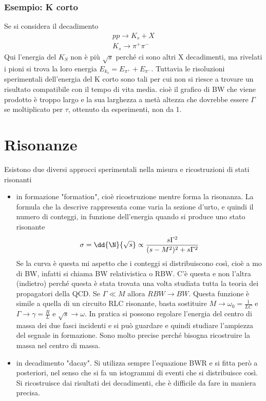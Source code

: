 \documentclass[12pt]{book}
\begin{document}
	\subsubsection{Esempio: K corto}
	Se si considera il decadimento 
	\begin{gather}
		p p \rightarrow K_s + X\\
		K_s \rightarrow \pi^+ \pi^-
	\end{gather}
	Qui l'energia del $K_S$ non è più $\sqrt{s}$ perché ci sono altri X decadimenti, ma rivelati i pioni si trova la loro energia $E_{k_s} = E_{\pi^+}+ E_{\pi^-}$. Tuttavia le risoluzioni sperimentali dell'energia del K corto sono tali per cui non si riesce a trovare un risultato compatibile con il tempo di vita media. cioè il grafico di BW che viene prodotto è troppo largo e la sua larghezza a metà altezza che dovrebbe essere $\Gamma$ se moltiplicato per $\tau$, ottenuto da esperimenti, non da 1.


\section{Risonanze}
Esistono due diversi approcci sperimentali nella misura e ricostruzioni di stati risonanti
\begin{itemize}
	\item in formazione "formation", cioè ricostruzione mentre forma la risonanza. La formula che la descrive rappresenta come varia la sezione d'urto, e quindi il numero di conteggi, in funzione dell'energia quando si produce uno stato risonante
	\begin{equation}
		\sigma = \dd{\N}{\sqrt{s}} \propto \frac{s \Gamma^2}{(s-M^2)^2 + s \Gamma^2}
	\end{equation}
	Se la curva è questa mi aspetto che i conteggi si distribuiscono così, cioè a mo di BW, infatti si chiama BW relativistica o RBW. C'è questa e non l'altra (indietro) perché questa è stata trovata una volta studiata tutta la teoria dei propagatori della QCD. Se $\Gamma \ll M$ allora $RBW \rightarrow BW$. Questa funzione è simile a quella di un circuito RLC risonante, basta sostituire $M \rightarrow \omega_0 = \frac{1}{LC}$ e $\Gamma \rightarrow \gamma =\frac{R}{L}$ e $\sqrt{s} \rightarrow \omega$. In pratica si possono regolare l'energia del centro di massa dei due fasci incidenti e si può guardare e quindi studiare l'ampiezza del segnale in formazione. Sono molto precise perché bisogna ricostruire la massa nel centro di massa.
	\item in decadimento "dacay". Si utilizza sempre l'equazione BWR e si fitta però a posteriori, nel senso che si fa un istogrammi di eventi che si distribuisce così. Si ricostruisce dai risultati dei decadimenti, che è difficile da fare in maniera precisa.
\end{itemize}
\end{document}

